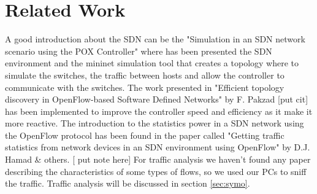 \documentclass[conference,10pt]{IEEEtran}
\begin{document}
\section{Related Work}\label{sec:sota}
A good introduction about the SDN can be the  "Simulation in an SDN network scenario using the
POX Controller" where has been presented the SDN environment and the mininet simulation
tool that creates a topology where to simulate the switches, the traffic between hosts and
allow the controller to communicate with the switches. The work presented in
"Efficient topology discovery in OpenFlow-based Software Defined Networks" by F. Pakzad [put cit]
has been implemented to improve the controller speed and efficiency as it make it more reactive.
The introduction to the statistics power in a SDN network using the OpenFlow protocol has been found
in the paper called "Getting traffic statistics from network devices in an
SDN environment using OpenFlow" by D.J. Hamad \& others. [ put note here]
For traffic analysis we haven't found any paper describing the characteristics of
some types of flows, so we used our PCs to sniff the traffic. Traffic analysis will be discussed in section \ref{sec:symo}.



\end{document}
